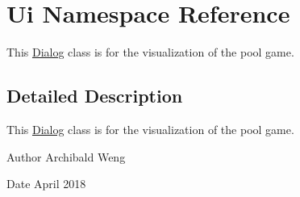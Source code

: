 \hypertarget{namespace_ui}{}\section{Ui Namespace Reference}
\label{namespace_ui}


This \mbox{\hyperlink{class_dialog}{Dialog}} class is for the visualization of the pool game.  




\subsection{Detailed Description}
This \mbox{\hyperlink{class_dialog}{Dialog}} class is for the visualization of the pool game. 

\begin{DoxyAuthor}{Author}
Archibald Weng 
\end{DoxyAuthor}
\begin{DoxyDate}{Date}
April 2018 
\end{DoxyDate}
